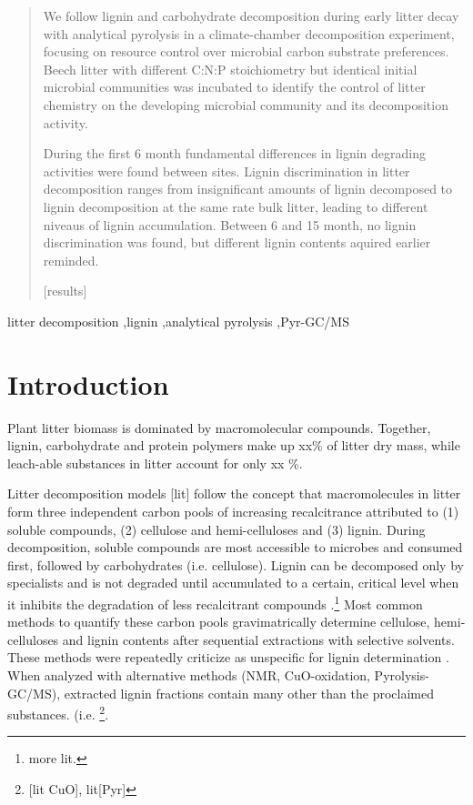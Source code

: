 \documentclass[authoryear,preprint,review,12pt]{elsarticle}
\begin{document}
\begin{frontmatter}
\begin{abstract}
We follow lignin and carbohydrate decomposition during early litter decay with analytical pyrolysis in a climate-chamber decomposition experiment, focusing on resource control over microbial carbon substrate preferences. Beech litter with different C:N:P stoichiometry but identical initial microbial communities was incubated to identify the control of litter chemistry on the developing microbial community and its decomposition activity. 

During the first 6 month fundamental differences in lignin degrading activities were found between sites. Lignin discrimination in litter decomposition ranges from insignificant amounts of lignin decomposed to lignin decomposition at the same rate bulk litter, leading to different niveaus of lignin accumulation. Between 6 and 15 month, no lignin discrimination was found, but different lignin contents aquired earlier reminded.

[results]

\end{abstract}
\begin{keyword}
 litter decomposition \sep lignin \sep analytical pyrolysis \sep Pyr-GC/MS

\end{keyword}
\end{frontmatter}

\linenumbers
\section{Introduction}
Plant litter biomass is dominated by macromolecular compounds. Together, lignin, carbohydrate and protein polymers make up xx\% of litter dry mass, while leach-able substances in litter account for only xx \%. 

Litter decomposition models [lit] follow the concept that macromolecules in litter form three independent carbon pools of increasing recalcitrance attributed to (1) soluble compounds, (2) cellulose and hemi-celluloses and (3) lignin. During decomposition, soluble compounds are most accessible to microbes and consumed first, followed by carbohydrates (i.e. cellulose). Lignin can be decomposed only by specialists and is not degraded until accumulated to a certain, critical level when it inhibits the degradation of less recalcitrant compounds \citep{Berg1980, Couteaux1995, Moorhead2006}.\footnote{more lit.} Most common methods to quantify these carbon pools gravimatrically determine cellulose, hemi-celluloses and lignin contents after sequential extractions with selective solvents. These methods were repeatedly criticize as unspecific for lignin determination \citep{Hatfield2005}. When analyzed with alternative methods (NMR, CuO-oxidation, Pyrolysis-GC/MS), extracted lignin fractions contain many other than the proclaimed substances. (i.e. \cite{Preston1997} \footnote{[lit CuO], lit[Pyr]}. 
\end{document}
